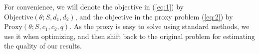 For convenience, we will denote the objective in (\ref{eq:1}) by $\text{Objective}(\theta;S,d_1,d_2)$, and the objective in the proxy problem (\ref{eq:2}) by $\text{Proxy}(\theta;S,c_1,c_2,q)$. As the proxy is easy to solve using standard methods, we use it when optimizing, and then shift back to the original problem for estimating the quality of our results.


